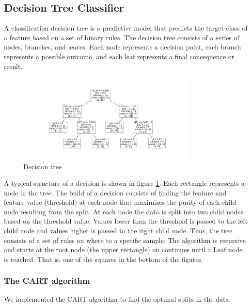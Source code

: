 \subsection{Decision Tree Classifier} \label{sec:method_descion_tree} 
A classification decision tree is a predictive model that predicts the target
class of a feature based on a set of binary rules. The decision tree consists of a series of
nodes, branches, and leaves. Each node represents a decision point, each branch
represents a possible outcome, and each leaf represents a final consequence or
result. 

\begin{figure}[H]
    \centering
    \includegraphics[width=0.8\textwidth]{Figures/descion_tree.png}
    \caption{Decision tree}  
    \label{fig:descision_tree} 
\end{figure}

A typical structure of a decision is shown in figure \ref{fig:descision_tree}. Each rectangle
represents a node in the tree. The build of a decision consists of finding
the feature and feature value (threshold) at each node that maximizes the
purity of each child node resulting from the split. At each node the data is
split into two child nodes based on the threshold value. Values lower than the threshold is
passed to the left child node and values higher is passed to the right child
node. Thus, the tree consists of a set of rules on where to a specific sample. The algorithm is recursive and starts at the
root node (the upper rectangle) on continues until a Leaf node is reached.
That is, one of the squares in the bottom of the figures.     


\subsubsection{The CART algorithm} \hfill

We implemented the CART algorithm to find the optimal splits in the data.  

